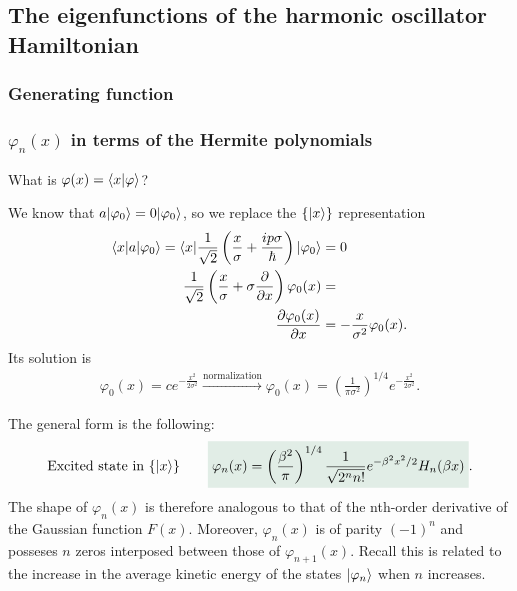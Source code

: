 \subsection{The eigenfunctions of the harmonic oscillator Hamiltonian}

\subsubsection{Generating function}

\subsubsection{$\varphi_n(x)$ in terms of the Hermite polynomials}
What is $\varphi(x)=\langle x|\varphi\rangle$?

We know that $a|\varphi_0\rangle=0|\varphi_0\rangle$, so we replace the $\{|x\rangle\}$ representation 
\begin{align*}
    \langle x|a|\varphi_0\rangle=\langle x|\frac{1}{\sqrt{2}}\left(\frac{x}{\sigma}+\frac{ip\sigma}{\hbar}\right)|\varphi_0\rangle&=0\\
    \frac{1}{\sqrt{2}}\left(\frac{x}{\sigma}+\sigma\frac{\partial}{\partial x}\right)\varphi_0(x)&=\\
    \frac{\partial\varphi_0(x)}{\partial x}&=-\frac{x}{\sigma^2}\varphi_0(x).
\end{align*}
Its solution is 
\begin{align*}
    \varphi_0(x)=ce^{-\frac{x^2}{2\sigma^2}}\stackrel{\text{normalization}}{\longrightarrow}\varphi_0(x)=\left(\frac{1}{\pi\sigma^2}\right)^{1/4}e^{-\frac{x^2}{2\sigma^2}}.
\end{align*}

The general form is the following:
\begin{align}
    \text{Excited state in $\{\ket{x}\}$}\qquad\highlight{\varphi_n(x)=
    \left(\frac{\beta^2}{\pi}\right)^{1/4}\frac{1}{\sqrt{2^nn!}}e^{-\beta^2x^2/2}H_n(\beta x)}.
\end{align}
The shape of $\varphi_n(x)$ is therefore analogous to that of the nth-order derivative of the Gaussian function $F(x)$. Moreover, $\varphi_n(x)$ is of parity 
$(-1)^n$ and posseses $n$ zeros interposed between those of $\varphi_{n+1}(x)$. Recall this is related to the increase in the average kinetic energy of the 
states $|\varphi_n\rangle$ when $n$ increases.
%
